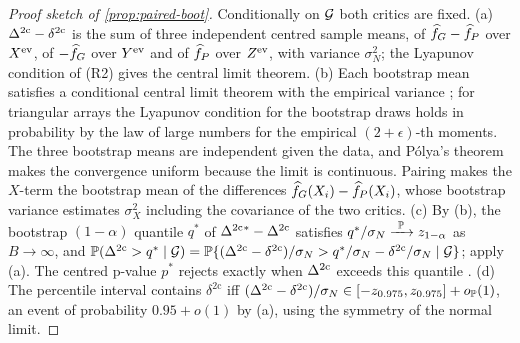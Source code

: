 \begin{proof}[Proof sketch of \cref{prop:paired-boot}]
Conditionally on $\mathcal{G}$ both critics are fixed. (a) $\Delta^{\mathrm{2c}}-\delta^{\mathrm{2c}}$ is the sum of
three independent centred sample means, of $\widehat{f}_G-\widehat{f}_P$ over $X^{\mathrm{ev}}$, of $-\widehat{f}_G$ over
$Y^{\mathrm{ev}}$ and of $\widehat{f}_P$ over $Z^{\mathrm{ev}}$, with variance $\sigma_N^2$; the Lyapunov condition
of (R2) gives the central limit theorem. (b) Each bootstrap mean satisfies a conditional central
limit theorem with the empirical variance \citep[Thm.~23.4]{vandervaart_1998_asymptotic}; for
triangular arrays the Lyapunov condition for the bootstrap draws holds in probability by the law
of large numbers for the empirical $(2+\epsilon)$-th moments. The three bootstrap means are
independent given the data, and P\'olya's theorem makes the convergence uniform because the limit
is continuous. Pairing makes the $X$-term the bootstrap mean of the differences
$\widehat{f}_G(X_i)-\widehat{f}_P(X_i)$, whose bootstrap variance estimates $\sigma_X^2$ including the
covariance of the two critics. (c) By (b), the bootstrap $(1-\alpha)$ quantile $q^*$ of
$\Delta^{\mathrm{2c}}{}^*-\Delta^{\mathrm{2c}}$ satisfies $q^*/\sigma_N\xrightarrow{\ \mathbb{P}\ } z_{1-\alpha}$ as $B\to\infty$, and
$\mathbb{P}(\Delta^{\mathrm{2c}}>q^*\mid\mathcal{G})=\mathbb{P}\{(\Delta^{\mathrm{2c}}-\delta^{\mathrm{2c}})/\sigma_N>q^*/\sigma_N-\delta^{\mathrm{2c}}/\sigma_N\mid\mathcal{G}\}$;
apply (a). The centred p-value $p^*$ rejects exactly when $\Delta^{\mathrm{2c}}$ exceeds this quantile
\citep{hall1991two}. (d) The percentile interval contains $\delta^{\mathrm{2c}}$ iff
$(\Delta^{\mathrm{2c}}-\delta^{\mathrm{2c}})/\sigma_N\in[-z_{0.975},z_{0.975}]+o_{\mathbb{P}}(1)$, an event of probability
$0.95+o(1)$ by (a), using the symmetry of the normal limit.
\end{proof}

